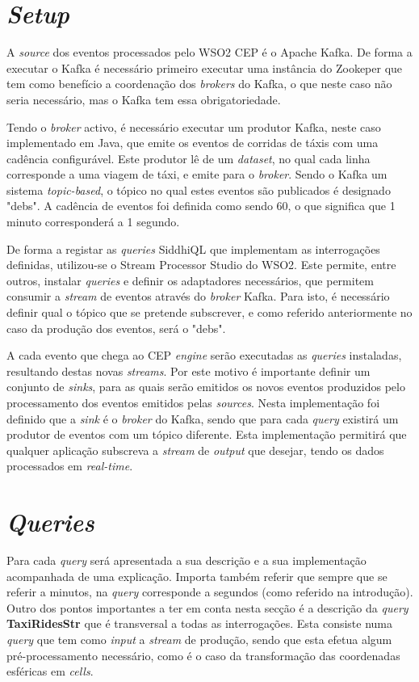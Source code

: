 \documentclass[article]{IEEEtran}
\begin{document}
	
	
\section{\textit{Setup}}

A \textit{source} dos eventos processados pelo WSO2 CEP é o Apache Kafka. De forma a executar o Kafka é necessário primeiro executar uma instância do Zookeper que tem como benefício a coordenação dos \textit{brokers} do Kafka, o que neste caso não seria necessário, mas o Kafka tem essa obrigatoriedade.

Tendo o \textit{broker} activo, é necessário executar um produtor Kafka, neste caso implementado em Java, que emite os eventos de corridas de táxis com uma cadência configurável. Este produtor lê de um \textit{dataset}, no qual cada linha corresponde a uma viagem de táxi, e emite para o \textit{broker}. Sendo o Kafka um sistema \textit{topic-based}, o tópico no qual estes eventos são publicados é designado "debs". A cadência de eventos foi definida como sendo 60, o que significa que 1 minuto corresponderá a 1 segundo.

De forma a registar as \textit{queries} SiddhiQL que implementam as interrogações definidas, utilizou-se o Stream Processor Studio do WSO2. Este permite, entre outros, instalar \textit{queries} e definir os adaptadores necessários, que permitem consumir a \textit{stream} de eventos através do \textit{broker} Kafka. Para isto, é necessário definir qual o tópico que se pretende subscrever, e como referido anteriormente no caso da produção dos eventos, será o "debs".

A cada evento que chega ao CEP \textit{engine} serão executadas as \textit{queries} instaladas, resultando destas novas \textit{streams}. Por este motivo é importante definir um conjunto de \textit{sinks}, para as quais serão emitidos os novos eventos produzidos pelo processamento dos eventos emitidos pelas \textit{sources}. Nesta implementação foi definido que a \textit{sink} é o \textit{broker} do Kafka, sendo que para cada \textit{query} existirá um produtor de eventos com um tópico diferente. Esta implementação permitirá que qualquer aplicação subscreva a \textit{stream} de \textit{output} que desejar, tendo os dados processados em \textit{real-time}.
 

\section{\textit{Queries}}
Para cada \textit{query} será apresentada a sua descrição e a sua implementação acompanhada de uma explicação. Importa também referir que sempre que se referir a minutos, na \textit{query} corresponde a segundos (como referido na introdução). Outro dos pontos importantes a ter em conta nesta secção é a descrição da \textit{query} \textbf{TaxiRidesStr} que é transversal a todas as interrogações. Esta consiste numa \textit{query} que tem como \textit{input} a \textit{stream} de produção, sendo que esta efetua algum pré-processamento necessário, como é o caso da transformação das coordenadas esféricas em \textit{cells}.
\end{document}
